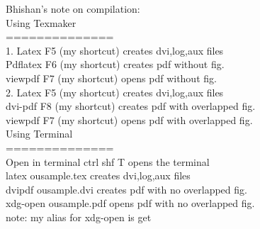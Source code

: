 
%




Bhishan's note on compilation:\\
Using Texmaker\\
==============\\
1. Latex    F5 (my shortcut)   	creates dvi,log,aux files\\
   Pdflatex F6 (my shortcut)  	creates pdf without fig.\\
   viewpdf  F7 (my shortcut)  	opens   pdf without fig.\\
   
2. Latex    F5 (my shortcut)   	creates dvi,log,aux files\\
   dvi-pdf  F8 (my shortcut)		creates pdf with overlapped fig.\\
   viewpdf  F7 (my shortcut)		opens   pdf with overlapped fig.\\
   
Using Terminal\\
==============\\
Open in terminal ctrl shf T    	opens the terminal\\
latex 	ousample.tex           	creates dvi,log,aux files\\
dvipdf 	ousample.dvi            	creates pdf with no overlapped fig.\\
xdg-open ousample.pdf			opens   pdf with no overlapped fig.\\
note: my alias for xdg-open is get\\
\\
\\		

\proposaltype{}


%


